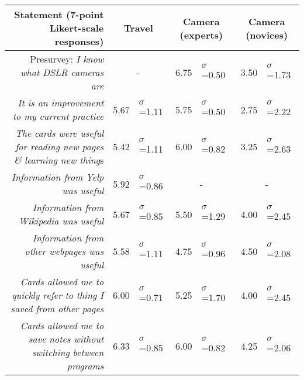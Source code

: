 \begin{table}
  \centering
  \footnotesize
  \begin{tabular}{ r  r l   r l r l }
  
	
	\multicolumn{1}{p{0.4\columnwidth}}{Statement (7-point Likert-scale responses)} &
	\multicolumn{2}{c}{Travel} &
	\multicolumn{2}{c}{Camera (experts)} &
	\multicolumn{2}{c}{Camera (novices)} \\
    
	\hline
	
	
	\multicolumn{1}{p{0.4\columnwidth}}{Presurvey: \textit{I know what DSLR cameras are}} &
	\multicolumn{2}{c}{-} &
    6.75 & $\sigma$=0.50 &
    3.50 & $\sigma$=1.73 \\
    
	\multicolumn{1}{p{0.4\columnwidth}}{\textit{It is an improvement to my current practice}} & 
    5.67  & $\sigma$=1.11 &
    5.75 & $\sigma$=0.50 &
    2.75 & $\sigma$=2.22 \\
    
	\multicolumn{1}{p{0.4\columnwidth}}{\textit{The cards were useful for reading new pages \& learning new thing}s} &
    5.42 & $\sigma$=1.11 &
    6.00 & $\sigma$=0.82 &
    3.25 & $\sigma$=2.63 \\
    
	\multicolumn{1}{p{0.4\columnwidth}}{\textit{Information from Yelp was useful
}} &
    5.92 & $\sigma$=0.86 &
	\multicolumn{2}{c}{-} &
	\multicolumn{2}{c}{-} \\
    
	\multicolumn{1}{p{0.4\columnwidth}}{\textit{Information from Wikipedia was useful}} &
    5.67 & $\sigma$=0.85 &
    5.50 & $\sigma$=1.29 &
    4.00 & $\sigma$=2.45 \\
    
	\multicolumn{1}{p{0.4\columnwidth}}{\textit{Information from other webpages was useful}} &
    5.58 & $\sigma$=1.11 &
    4.75 & $\sigma$=0.96 &
    4.50 & $\sigma$=2.08 \\
    
    
	\multicolumn{1}{p{0.4\columnwidth}}{\textit{Cards allowed me to quickly refer to thing I saved from other pages}} &
    6.00 & $\sigma$=0.71 &
    5.25 & $\sigma$=1.70 &
    4.00 & $\sigma$=2.45 \\
    
	\multicolumn{1}{p{0.4\columnwidth}}{\textit{Cards allowed me to save notes without switching between programs}
} &
    6.33 & $\sigma$=0.85 &
    6.00 & $\sigma$=0.82 &
    4.25 & $\sigma$=2.06 \\
    

\end{tabular}
\end{table}
